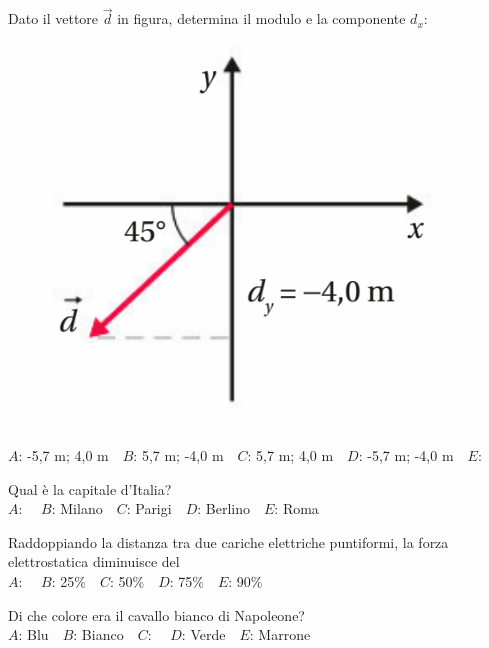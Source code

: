 \mcquestionheader Dato il vettore $\vec{d}$ in figura, determina il modulo e la componente $d_x$: \begin{figure}[h!]   \begin{center}     \includegraphics[scale=0.35]{vettored.png}   \end{center} \end{figure}\\
{$A$}: -5,7 m; 4,0 m\ \ {$B$}: 5,7 m; -4,0 m\ \ {$C$}: 5,7 m; 4,0 m\ \ {$D$}: -5,7 m; -4,0 m\ \ {$E$}: \ \ 

\mcquestionfooter



\def\mcquestionnumber{10}


\mcquestionheader Qual è la capitale d’Italia?\\
{$A$}: \ \ {$B$}: Milano\ \ {$C$}: Parigi\ \ {$D$}: Berlino\ \ {$E$}: Roma\ \ 

\mcquestionfooter



\def\mcquestionnumber{11}


\mcquestionheader Raddoppiando la distanza tra due cariche elettriche puntiformi, la forza elettrostatica diminuisce del\\
{$A$}: \ \ {$B$}: 25\%\ \ {$C$}: 50\%\ \ {$D$}: 75\%\ \ {$E$}: 90\%\ \ 

\mcquestionfooter



\def\mcquestionnumber{12}


\mcquestionheader Di che colore era il cavallo bianco di Napoleone?\\
{$A$}: Blu\ \ {$B$}: Bianco\ \ {$C$}: \ \ {$D$}: Verde\ \ {$E$}: Marrone\ \ 

